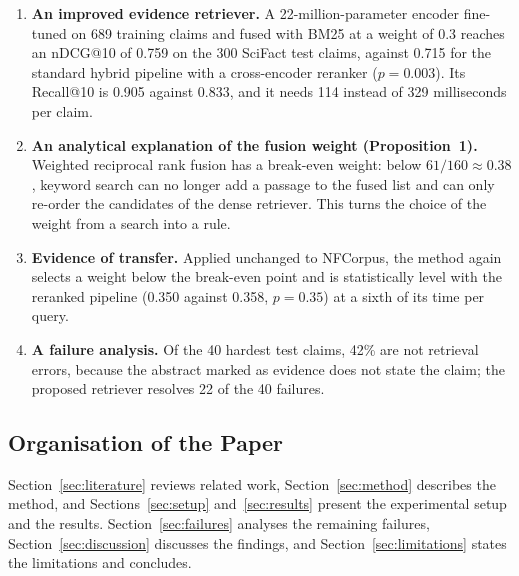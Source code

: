 \begin{enumerate}
\item \textbf{An improved evidence retriever.} A 22-million-parameter encoder fine-tuned on
689 training claims and fused with BM25 at a weight of 0.3 reaches an nDCG@10 of 0.759 on the
300 SciFact test claims, against 0.715 for the standard hybrid pipeline with a cross-encoder
reranker ($p = 0.003$). Its Recall@10 is 0.905 against 0.833, and it needs 114 instead of 329
milliseconds per claim.
\item \textbf{An analytical explanation of the fusion weight (Proposition~1).} Weighted
reciprocal rank fusion has a break-even weight: below $61/160 \approx 0.38$, keyword search
can no longer add a passage to the fused list and can only re-order the candidates of the
dense retriever. This turns the choice of the weight from a search into a rule.
\item \textbf{Evidence of transfer.} Applied unchanged to NFCorpus, the method again selects a
weight below the break-even point and is statistically level with the reranked pipeline (0.350
against 0.358, $p = 0.35$) at a sixth of its time per query.
\item \textbf{A failure analysis.} Of the 40 hardest test claims, 42\% are not retrieval
errors, because the abstract marked as evidence does not state the claim; the proposed
retriever resolves 22 of the 40 failures.
\end{enumerate}

\subsection{Organisation of the Paper}

Section~\ref{sec:literature} reviews related work, Section~\ref{sec:method} describes the
method, and Sections~\ref{sec:setup} and~\ref{sec:results} present the experimental setup and
the results. Section~\ref{sec:failures} analyses the remaining failures,
Section~\ref{sec:discussion} discusses the findings, and Section~\ref{sec:limitations} states
the limitations and concludes.
